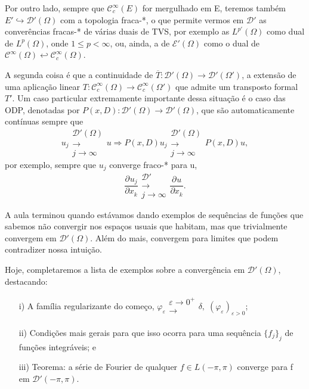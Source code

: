 \documentclass[../distribution_theory_notes.tex]{subfiles}
\begin{document}
\begin{tcolorbox}[
		skin=enhanced,
		title=Observação,
		fonttitle=\bfseries,
		colframe=black,
		colbacktitle=cyan!75!white,
		colback=cyan!15,
		colbacklower=black,
		coltitle=black,
		drop fuzzy shadow,
	]
	Por outro lado, sempre que \(\mathcal{C}_{c}^{\infty}(E)\) for mergulhado em E, teremos também \(E'\hookrightarrow \mathcal{D}'(\Omega )\) com a topologia fraca-*, o que permite vermos em \(\mathcal{D}'\) as converências fracas-* de várias duais de TVS, por exemplo as \(L^{p'}(\Omega )\) como dual de \(L^{p}(\Omega )\), onde \(1\leq p <\infty\), ou, ainda,
	a de \(\mathcal{E}'(\Omega )\) como o dual de \(\mathcal{C}^{\infty}(\Omega )\hookleftarrow \mathcal{C}_{c}^{\infty}(\Omega )\).
\end{tcolorbox}
A segunda coisa é que a continuidade de \(\overline{T}:\mathcal{D}'(\Omega )\rightarrow \mathcal{D}'(\Omega ')\), a extensão de uma aplicação linear \(T:\mathcal{C}_{c}^{\infty}(\Omega )\rightarrow \mathcal{C}_{c}^{\infty}(\Omega ')\) que admite um transposto formal \(T'.\)
Um caso particular extremamente importante dessa situação é o caso das ODP, denotadas por \(P(x, D):\mathcal{D}'(\Omega )\rightarrow \mathcal{D}'(\Omega )\), que são automaticamente contínuas sempre que
\[
	u_{j}\substack{ \mathcal{D}'(\Omega )\\ \longrightarrow \\ j\to \infty}u \Rightarrow P(x, D)u_{j}\substack{\mathcal{D}'(\Omega ) \\ \longrightarrow \\ j\to \infty}P(x, D)u,
\]
por exemplo, sempre que \(u_{j}\) converge fraco-* para u,
\[
	\frac{\partial^{}u_{j}}{\partial x_{k}^{}}\substack{ \mathcal{D}'\\ \longrightarrow \\ j\to \infty}\frac{\partial^{}u}{\partial x_{k}^{}}.
\]

A aula terminou quando estávamos dando exemplos de sequências de funções que sabemos não convergir nos espaços usuais que habitam, mas que
trivialmente convergem em \(\mathcal{D}'(\Omega )\). Além do mais, convergem para limites que podem contradizer nossa intuição.

Hoje, completaremos a lista de exemplos sobre a convergência em \(\mathcal{D}'(\Omega )\), destacando:
\begin{itemize}
	\item[i)] A família regularizante do começo, \(\varphi_{\varepsilon }\substack{\varepsilon \to 0^{+} \\ \longrightarrow \\ }\delta,\; (\varphi_\varepsilon )_{\varepsilon > 0} \);
	\item[ii)] Condições mais gerais para que isso ocorra para uma sequência \(\{f_{j}\}_{j}\) de funções integráveis; e
	\item[iii)] Teorema: a série de Fourier de qualquer \(f\in L(-\pi , \pi )\) converge para f em \(\mathcal{D}'(-\pi , \pi )\).
\end{itemize}
\end{document}
